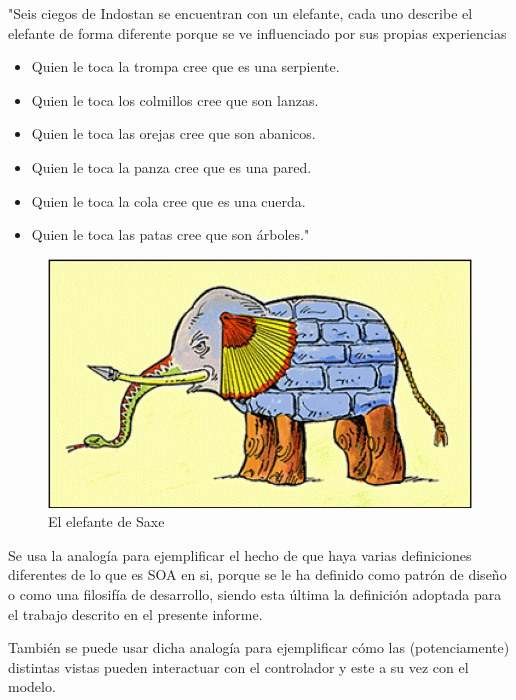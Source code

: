     "Seis ciegos de Indostan se encuentran con un elefante, cada uno describe el elefante de forma diferente porque se ve influenciado por sus propias experiencias
    
    \begin{itemize}
        \item Quien le toca la trompa cree que es una serpiente.
        \item Quien le toca los colmillos cree que son lanzas.
        \item Quien le toca las orejas cree que son abanicos.
        \item Quien le toca la panza cree que es una pared.
        \item Quien le toca la cola cree que es una cuerda.
        \item Quien le toca	las patas cree que son árboles."
    \end{itemize}
    

    \begin{figure}
        \begin{center}
            \includegraphics[scale=.75]{figures/Elefante}
        \end{center}
        \caption {El elefante de Saxe}
    \end{figure}

    Se usa la analogía para ejemplificar el hecho de que haya varias definiciones diferentes de lo que es SOA en si, porque se le ha definido como patrón de diseño o como una filosifía de desarrollo, siendo esta última la definición adoptada para el trabajo descrito en el presente informe.
    
    También se puede usar dicha analogía para ejemplificar cómo las (potenciamente) distintas vistas pueden interactuar con el controlador y este a su vez con el modelo.


